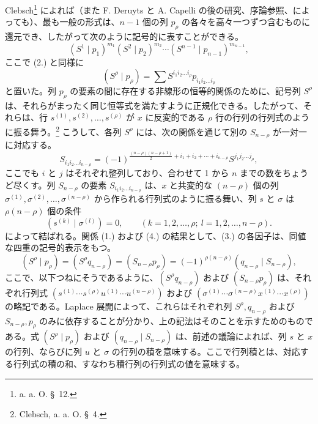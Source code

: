 \documentclass[11pt]{article}
\begin{document}
Clebsch\footnote{a. a. O. \S\ 12.} によれば（また F. Deruyts と A. Capelli の後の研究、序論参照、によっても）、最も一般の形式は、$n-1$ 個の列 $p_\rho$ の各々を高々一つずつ含むものに還元でき、したがって次のように記号的に表すことができる。
\begin{equation}
 (S^1\mid p_1)^{m_1}(S^2\mid p_2)^{m_2}\cdots(S^{n-1}\mid p_{n-1})^{m_{n-1}},
\tag{3}
\end{equation}
ここで (2.) と同様に
\[
 (S^\rho\mid p_\rho)=\sum S^{i_1i_2\ldots i_\rho}p_{i_1i_2\ldots i_\rho}
\]
と置いた。列 $p_\rho$ の要素の間に存在する非線形の恒等的関係のために、記号列 $S^\rho$ は、それらがまったく同じ恒等式を満たすように正規化できる。したがって、それらは、行 $s^{(1)},s^{(2)},\ldots,s^{(\rho)}$ が $x$ に反変的である $\rho$ 行の行列の行列式のように振る舞う。\footnote{Clebsch, a. a. O. \S\ 4.} こうして、各列 $S^\rho$ には、次の関係を通じて別の $S_{n-\rho}$ が一対一に対応する。
\begin{equation}
 S_{i_1i_2\ldots i_{n-\rho}}=(-1)^{\frac{(n-\rho)(n-\rho+1)}2+i_1+i_2+\cdots+i_{n-\rho}}S^{j_1j_2\ldots j_\rho},
\tag{4}
\end{equation}
ここでも $i$ と $j$ はそれぞれ整列しており、合わせて 1 から $n$ までの数をちょうど尽くす。列 $S_{n-\rho}$ の要素 $S_{i_1i_2\ldots i_{n-\rho}}$ は、$x$ と共変的な $(n-\rho)$ 個の列 $\sigma^{(1)},\sigma^{(2)},\ldots,\sigma^{(n-\rho)}$ から作られる行列式のように振る舞い、列 $s$ と $\sigma$ は $\rho(n-\rho)$ 個の条件
\begin{equation}
 (s^{(k)}\mid \sigma^{(l)})=0,\qquad(k=1,2,\ldots,\rho;\ l=1,2,\ldots,n-\rho).
\tag{5}
\end{equation}
によって結ばれる。関係 (1.) および (4.) の結果として、(3.) の各因子は、同値な四重の記号的表示をもつ。
\begin{equation}
 (S^\rho\mid p_\rho)=(S^\rho q_{n-\rho})=(S_{n-\rho}p_\rho)=(-1)^{\rho(n-\rho)}(q_{n-\rho}\mid S_{n-\rho}),
\tag{6}
\end{equation}
ここで、以下つねにそうであるように、$(S^\rho q_{n-\rho})$ および $(S_{n-\rho}p_\rho)$ は、それぞれ行列式 $(s^{(1)}\cdots s^{(\rho)}u^{(1)}\cdots u^{(n-\rho)})$ および $(\sigma^{(1)}\cdots\sigma^{(n-\rho)}x^{(1)}\cdots x^{(\rho)})$ の略記である。Laplace 展開によって、これらはそれぞれ列 $S^\rho,q_{n-\rho}$ および $S_{n-\rho},p_\rho$ のみに依存することが分かり、上の記法はそのことを示すためのものである。式 $(S^\rho\mid p_\rho)$ および $(q_{n-\rho}\mid S_{n-\rho})$ は、前述の議論によれば、列 $s$ と $x$ の行列、ならびに列 $u$ と $\sigma$ の行列の積を意味する。ここで行列積とは、対応する行列式の積の和、すなわち積行列の行列式の値を意味する。
\end{document}
